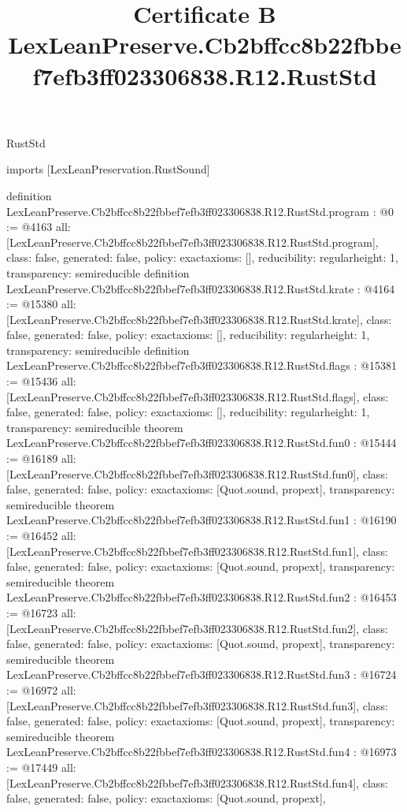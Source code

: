 \begin{lexlean}{RustStd}
\title{Certificate B LexLeanPreserve.Cb2bffcc8b22fbbef7efb3ff023306838.R12.RustStd}
\begin{coremodule}
imports [LexLeanPreservation.RustSound]

definition LexLeanPreserve.Cb2bffcc8b22fbbef7efb3ff023306838.R12.RustStd.program : @0 := @4163 {
  all: [LexLeanPreserve.Cb2bffcc8b22fbbef7efb3ff023306838.R12.RustStd.program],
  class: false,
  generated: false,
  policy: exact{axioms: []},
  reducibility: regular{height: 1},
  transparency: semireducible
}
definition LexLeanPreserve.Cb2bffcc8b22fbbef7efb3ff023306838.R12.RustStd.krate : @4164 := @15380 {
  all: [LexLeanPreserve.Cb2bffcc8b22fbbef7efb3ff023306838.R12.RustStd.krate],
  class: false,
  generated: false,
  policy: exact{axioms: []},
  reducibility: regular{height: 1},
  transparency: semireducible
}
definition LexLeanPreserve.Cb2bffcc8b22fbbef7efb3ff023306838.R12.RustStd.flags : @15381 := @15436 {
  all: [LexLeanPreserve.Cb2bffcc8b22fbbef7efb3ff023306838.R12.RustStd.flags],
  class: false,
  generated: false,
  policy: exact{axioms: []},
  reducibility: regular{height: 1},
  transparency: semireducible
}
theorem LexLeanPreserve.Cb2bffcc8b22fbbef7efb3ff023306838.R12.RustStd.fun0 : @15444 := @16189 {
  all: [LexLeanPreserve.Cb2bffcc8b22fbbef7efb3ff023306838.R12.RustStd.fun0],
  class: false,
  generated: false,
  policy: exact{axioms: [Quot.sound, propext]},
  transparency: semireducible
}
theorem LexLeanPreserve.Cb2bffcc8b22fbbef7efb3ff023306838.R12.RustStd.fun1 : @16190 := @16452 {
  all: [LexLeanPreserve.Cb2bffcc8b22fbbef7efb3ff023306838.R12.RustStd.fun1],
  class: false,
  generated: false,
  policy: exact{axioms: [Quot.sound, propext]},
  transparency: semireducible
}
theorem LexLeanPreserve.Cb2bffcc8b22fbbef7efb3ff023306838.R12.RustStd.fun2 : @16453 := @16723 {
  all: [LexLeanPreserve.Cb2bffcc8b22fbbef7efb3ff023306838.R12.RustStd.fun2],
  class: false,
  generated: false,
  policy: exact{axioms: [Quot.sound, propext]},
  transparency: semireducible
}
theorem LexLeanPreserve.Cb2bffcc8b22fbbef7efb3ff023306838.R12.RustStd.fun3 : @16724 := @16972 {
  all: [LexLeanPreserve.Cb2bffcc8b22fbbef7efb3ff023306838.R12.RustStd.fun3],
  class: false,
  generated: false,
  policy: exact{axioms: [Quot.sound, propext]},
  transparency: semireducible
}
theorem LexLeanPreserve.Cb2bffcc8b22fbbef7efb3ff023306838.R12.RustStd.fun4 : @16973 := @17449 {
  all: [LexLeanPreserve.Cb2bffcc8b22fbbef7efb3ff023306838.R12.RustStd.fun4],
  class: false,
  generated: false,
  policy: exact{axioms: [Quot.sound, propext]},
}
\end{coremodule}
\end{lexlean}
